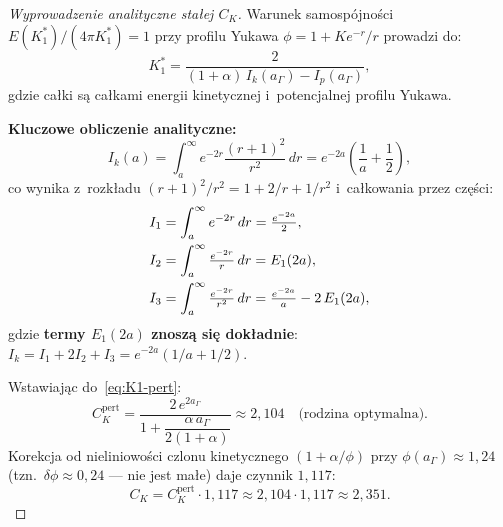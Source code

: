 \begin{proof}[Wyprowadzenie analityczne sta\l{}ej $C_K$]
Warunek samospójno\'sci $E(K^*_1)/(4\pi K^*_1) = 1$
przy profilu Yukawa $\phi = 1 + K e^{-r}/r$ prowadzi do:
\begin{equation}\label{eq:K1-pert}
    K^*_1 = \frac{2}{\displaystyle (1+\alpha)\,I_k(a_\Gamma) - I_p(a_\Gamma)},
\end{equation}
gdzie ca\l{}ki s\k{a} ca\l{}kami energii kinetycznej i~potencjalnej
profilu Yukawa.

\textbf{Kluczowe obliczenie analityczne:}
\begin{equation}\label{eq:Ik-exact}
    I_k(a) = \int_a^\infty e^{-2r}\frac{(r+1)^2}{r^2}\,dr
    = e^{-2a}\!\left(\frac{1}{a} + \frac{1}{2}\right),
\end{equation}
co wynika z~rozk\l{}adu $(r+1)^2/r^2 = 1 + 2/r + 1/r^2$
i~ca\l{}kowania przez cz\k{e}\'sci:
\begin{align}
    I_1 &= \int_a^\infty e^{-2r}\,dr = \tfrac{e^{-2a}}{2}, \notag\\
    I_2 &= \int_a^\infty \tfrac{e^{-2r}}{r}\,dr = E_1(2a), \notag\\
    I_3 &= \int_a^\infty \tfrac{e^{-2r}}{r^2}\,dr
         = \tfrac{e^{-2a}}{a} - 2\,E_1(2a), \notag
\end{align}
gdzie \textbf{termy $E_1(2a)$ znosz\k{a} si\k{e} dok\l{}adnie}:
$I_k = I_1 + 2I_2 + I_3 = e^{-2a}(1/a + 1/2)$.

Wstawiaj\k{a}c do~\eqref{eq:K1-pert}:
\begin{equation}\label{eq:CK-pert}
    \boxed{C_K^{\mathrm{pert}} = \frac{2\,e^{2a_\Gamma}}{1 + \dfrac{\alpha\,a_\Gamma}{2(1+\alpha)}}}
    \approx 2{,}104 \quad\text{(rodzina optymalna)}.
\end{equation}
Korekcja od nieliniowo\'sci czlonu kinetycznego
$(1+\alpha/\phi)$ przy $\phi(a_\Gamma) \approx 1{,}24$
(tzn.~$\delta\phi \approx 0{,}24$ --- nie jest ma\l{}e)
daje czynnik $1{,}117$:
\begin{equation}\label{eq:CK-full}
    C_K = C_K^{\mathrm{pert}} \cdot 1{,}117
    \approx 2{,}104 \cdot 1{,}117 \approx 2{,}351.
\end{equation}
\end{proof}

